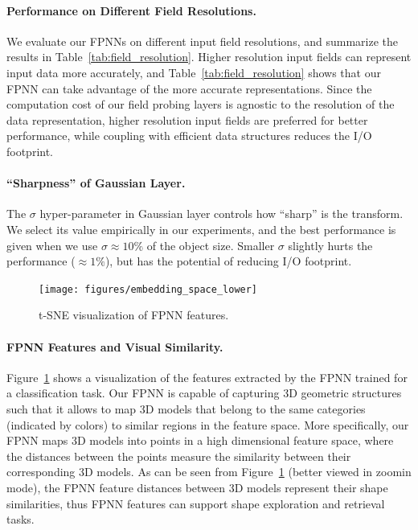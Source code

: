 \paragraph{Performance on Different Field Resolutions.}
We evaluate our FPNNs on different input field resolutions, and summarize the results in Table~\ref{tab:field_resolution}. Higher resolution input fields can represent input data more accurately, and Table~\ref{tab:field_resolution} shows that our FPNN can take advantage of the more accurate representations. Since the computation cost of our field probing layers is agnostic to the resolution of the data representation, higher resolution input fields are preferred for better performance, while coupling with efficient data structures reduces the I/O footprint.

\paragraph{``Sharpness'' of Gaussian Layer.} The $\sigma$ hyper-parameter in Gaussian layer controls how ``sharp'' is the transform. We select its value empirically in our experiments, and the best performance is given when we use $\sigma \approx 10\%$ of the object size. Smaller $\sigma$ slightly hurts the performance ($\approx 1\%$), but has the potential of reducing I/O footprint.

\begin{figure}
	\vspace{-1.5cm}
	\begin{center}
		\texttt{[image: figures/embedding\_space\_lower]}
	\end{center}
	\vspace{-0.5cm}
	\caption{t-SNE visualization of FPNN features.}
	\label{fig:embedding_space}
	\vspace{-0.4cm}
\end{figure}

\paragraph{FPNN Features and Visual Similarity.} Figure~\ref{fig:embedding_space} shows a visualization of the features extracted by the FPNN trained for a classification task. Our FPNN is capable of capturing 3D geometric structures such that it allows to map 3D models that belong to the same categories (indicated by colors) to similar regions in the feature space. More specifically, our FPNN maps 3D models into points in a high dimensional feature space, where the distances between the points measure the similarity between their corresponding 3D models. As can be seen from Figure~\ref{fig:embedding_space} (better viewed in zoomin mode),  the FPNN feature distances between 3D models represent their shape similarities, thus FPNN features can support shape exploration and retrieval tasks.

